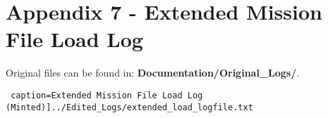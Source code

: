 \documentclass[12pt]{article}
\begin{document}
\section*{Appendix 7 - Extended Mission File Load Log}

Original files can be found in: \textbf{Documentation/Original\_Logs/}.

\texttt{ caption=Extended Mission File Load Log (Minted)]{../Edited_Logs/extended_load_logfile.txt}}
\end{document}
